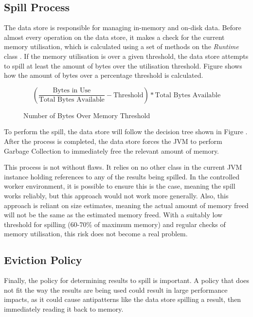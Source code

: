 \subsection{Spill Process}
The data store is responsible for managing in-memory and on-disk data. Before almost every operation on the data store, it makes a check for the current memory utilisation, which is calculated using a set of methods on the \textit{Runtime} class . If the memory utilisation is over a given threshold, the data store attempts to spill at least the amount of bytes over the utilisation threshold. Figure \label{fig:bytes-over-memory-threshold} shows how the amount of bytes over a percentage threshold is calculated.

\begin{figure}[h]
	\centering
	\[ \left( \frac{\text{Bytes in Use}}{\text{Total Bytes Available}} - \text{Threshold} \right) * \text{Total Bytes Available} \]
	\caption{Number of Bytes Over Memory Threshold}
	\label{fig:bytes-over-memory-threshold}
\end{figure}

To perform the spill, the data store will follow the decision tree shown in Figure . After the process is completed, the data store forces the JVM to perform Garbage Collection to immediately free the relevant amount of memory.


This process is not without flaws. It relies on no other class in the current JVM instance  holding references to any of the results being spilled. In the controlled worker environment, it is possible to ensure this is the case, meaning the spill works reliably, but this approach would not work more generally. Also, this approach is reliant on size estimates, meaning the actual amount of memory freed will not be the same as the estimated memory freed. With a suitably low threshold for spilling (60-70\% of maximum memory) and regular checks of memory utilisation, this risk does not become a real problem.

\subsection{Eviction Policy}
Finally, the policy for determining results to spill is important. A policy that does not fit the way the results are being used could result in large performance impacts, as it could cause antipatterns like the data store spilling a result, then immediately reading it back to memory.

